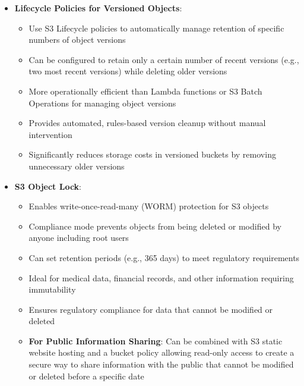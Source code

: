 \documentclass[11pt,a4paper]{report}
\begin{document}
\begin{itemize}
\begin{itemize}
  \item Versioning-enabled buckets allow you to recover from both unintended user actions and application failures
  \item Most effective combination for protecting sensitive audit documents and confidential information
  \item For confidential audit documents, combining versioning and MFA Delete provides the most secure protection against accidental or malicious deletion IF compliance mode isn't sufficient, however compliance mode is the best option for regulatory compliance
  \item This approach directly addresses security concerns by making deletion of documents more secure, requiring a physical MFA device to confirm such actions
\end{itemize}
  \item \textbf{Lifecycle Policies for Versioned Objects}:
\begin{itemize}
  \item Use S3 Lifecycle policies to automatically manage retention of specific numbers of object versions
  \item Can be configured to retain only a certain number of recent versions (e.g., two most recent versions) while deleting older versions
  \item More operationally efficient than Lambda functions or S3 Batch Operations for managing object versions
  \item Provides automated, rules-based version cleanup without manual intervention
  \item Significantly reduces storage costs in versioned buckets by removing unnecessary older versions
\end{itemize}
  \item \textbf{S3 Object Lock}:
\begin{itemize}
  \item Enables write-once-read-many (WORM) protection for S3 objects
  \item Compliance mode prevents objects from being deleted or modified by anyone including root users
  \item Can set retention periods (e.g., 365 days) to meet regulatory requirements
  \item Ideal for medical data, financial records, and other information requiring immutability
  \item Ensures regulatory compliance for data that cannot be modified or deleted
  \item \textbf{For Public Information Sharing}: Can be combined with S3 static website hosting and a bucket policy allowing read-only access to create a secure way to share information with the public that cannot be modified or deleted before a specific date

\end{itemize}
\end{itemize}
\end{document}
